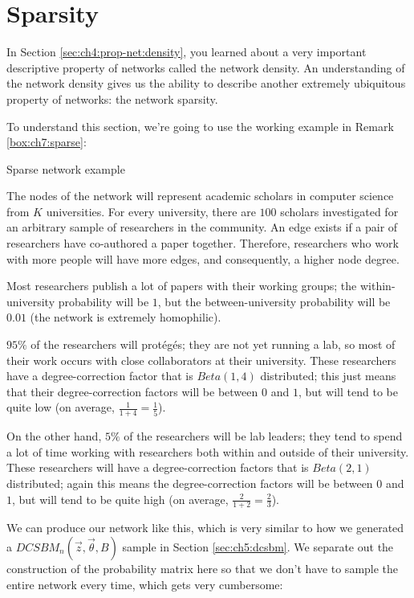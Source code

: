 \section{Sparsity}
\label{sec:ch7:sparse}

In Section \ref{sec:ch4:prop-net:density}, you learned about a very important descriptive property of networks called the network density. An understanding of the network density gives us the ability to describe another extremely ubiquitous property of networks: the network sparsity. 


To understand this section, we're going to use the working example in Remark \ref{box:ch7:sparse}:

\begin{floatingbox}[h]\caption{Sparse network example}
\label{box:ch7:sparse}
The nodes of the network will represent academic scholars in computer science from $K$ universities. For every university, there are $100$ scholars investigated for an arbitrary sample of researchers in the community. An edge exists if a pair of researchers have co-authored a paper together. Therefore, researchers who work with more people will have more edges, and consequently, a higher node degree.

Most researchers publish a lot of papers with their working groups; the within-university probability will be $1$, but the between-university probability will be $0.01$ (the network is extremely homophilic).

$95\%$ of the researchers will prot\'eg\'es; they are not yet running a lab, so most of their work occurs with close collaborators at their university. These researchers have a degree-correction factor that is $Beta(1, 4)$ distributed; this just means that their degree-correction factors will be between $0$ and $1$, but will tend to be quite low (on average, $\frac{1}{1 + 4} = \frac{1}{5}$). 

On the other hand, $5\%$ of the researchers will be lab leaders; they tend to spend a lot of time working with researchers both within and outside of their university. These researchers will have a degree-correction factors that is $Beta(2, 1)$ distributed; again this means the degree-correction factors will be between $0$ and $1$, but will tend to be quite high (on average, $\frac{2}{1 + 2} = \frac{2}{3}$).
\end{floatingbox}


We can produce our network like this, which is very similar to how we generated a $DCSBM_n(\vec z, \vec \theta, B)$ sample in Section \ref{sec:ch5:dcsbm}. We separate out the construction of the probability matrix here so that we don't have to sample the entire network every time, which gets very cumbersome:


